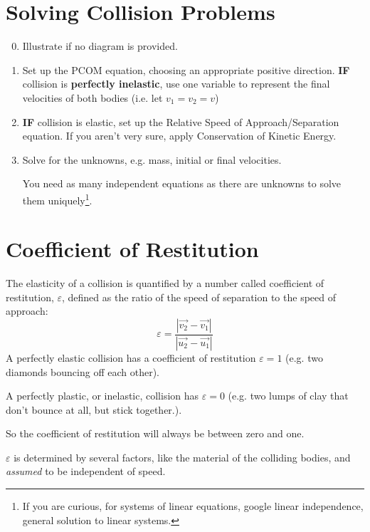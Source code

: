\documentclass[11pt]{article}
\begin{document}
	\pagebreak
	\begin{appendices}
		\label{appdx}
		\section{Solving Collision Problems}
		\begin{enumerate}[label={\underline{Step \arabic*}}]
			\setcounter{enumi}{-1}
			\item Illustrate if no diagram is provided.
			\item Set up the PCOM equation, choosing an appropriate positive direction. \textbf{IF} collision is \textbf{perfectly inelastic}, use one variable to represent the final velocities of both bodies (i.e. let $v_1=v_2=v$)
			\item \textbf{IF} collision is elastic, set up the Relative Speed of Approach/Separation equation. If you aren't very sure, apply Conservation of Kinetic Energy.
			\item Solve for the unknowns, e.g. mass, initial or final velocities.
			
			You need as many independent equations as there are unknowns to solve them uniquely\footnote{If you are curious, for systems of linear equations, google linear independence, general solution to linear systems.}.
		\end{enumerate}
		\vfill
		\section{Coefficient of Restitution}
		The elasticity of a collision is quantified by a number called coefficient of restitution, $\varepsilon$, defined as the ratio of the speed of separation to the speed of approach:
		\begin{equation}
			\varepsilon = \frac{|\vec{v_2} - \vec{v_1}|}{|\vec{u_2} - \vec{u_1}|}
		\end{equation}
		A perfectly elastic collision has a coefficient of restitution $\varepsilon = 1$ (e.g. two diamonds bouncing off each other). 
		
		A perfectly plastic, or inelastic, collision has $\varepsilon = 0$ (e.g. two lumps of clay that don't bounce at all, but stick together.).
		
		So the coefficient of restitution will always be between zero and one. 
		
		$\varepsilon$ is determined by several factors, like the material of the colliding bodies, and \textit{assumed} to be independent of speed. 
		\vfill
		\pagebreak

\end{appendices}
\end{document}
